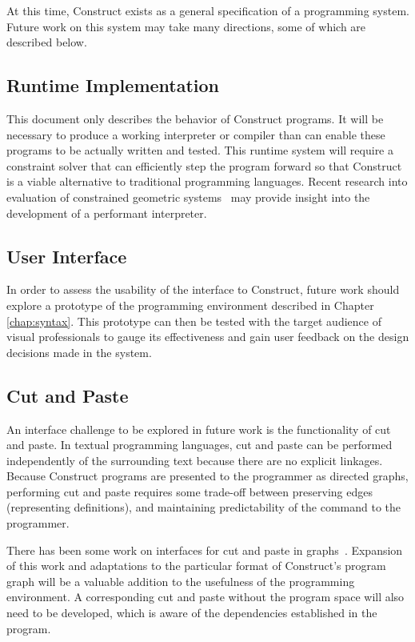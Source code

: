 \documentclass[twoside,openright,11pt]{report}
\begin{document}
At this time, Construct exists as a general specification of a programming system. 
Future work on this system may take many directions, some of which are described below.

\subsection{Runtime Implementation}

This document only describes the behavior of Construct programs. 
It will be necessary to produce a working interpreter or compiler than can enable these programs to be actually written and tested. 
This runtime system will require a constraint solver that can efficiently step the program forward so that Construct is a viable alternative to traditional programming languages. 
Recent research into evaluation of constrained geometric systems~\cite{alberti2001objsa,freixas2010constraint,pion2006lazy} may provide insight into the development of a performant interpreter.

\subsection{User Interface}

In order to assess the usability of the interface to Construct, future work should explore a prototype of the programming environment described in Chapter \ref{chap:syntax}.
This prototype can then be tested with the target audience of visual professionals to gauge its effectiveness and gain user feedback on the design decisions made in the system.

\subsection{Cut and Paste}

An interface challenge to be explored in future work is the functionality of cut and paste. 
In textual programming languages, cut and paste can be performed independently of the surrounding text because there are no explicit linkages.
Because Construct programs are presented to the programmer as directed graphs, performing cut and paste requires some trade-off between preserving edges (representing definitions), and maintaining predictability of the command to the programmer.

There has been some work on interfaces for cut and paste in graphs~\cite{ibrahim1998graphpaste}.
Expansion of this work and adaptations to the particular format of Construct's program graph will be a valuable addition to the usefulness of the programming environment.
A corresponding cut and paste without the program space will also need to be developed, which is aware of the dependencies established in the program.
\end{document}

